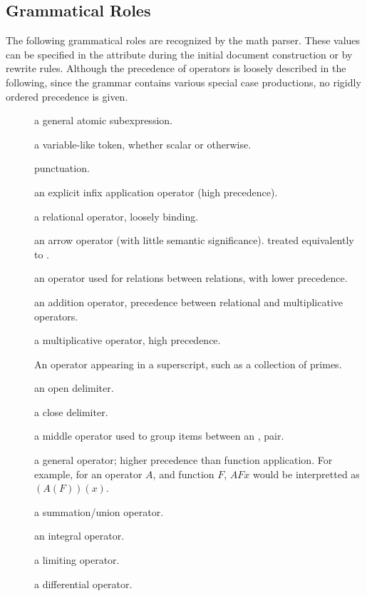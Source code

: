 \documentclass{article}
\begin{document}
\subsection{Grammatical Roles}\label{app:mathroles}
The following grammatical roles are recognized by the math parser.
These values can be specified in the  attribute during the initial 
document construction or by rewrite rules.  Although the precedence of operators
is loosely described in the following, since the grammar contains various special
case productions, no rigidly ordered precedence is given.
\begin{description}
\item[] a general atomic subexpression.
\item[] a variable-like token, whether scalar or otherwise.
\item[] punctuation.
\item[] an explicit infix application operator (high precedence).
\item[] a relational operator, loosely binding.
\item[] an arrow operator (with little semantic significance).
  treated equivalently to .
\item[] an operator used for relations between relations, with lower precedence.
\item[] an addition operator, precedence between relational and multiplicative operators.
\item[] a multiplicative operator, high precedence.
\item[] An operator appearing in a superscript, such as a collection of primes.
\item[] an open delimiter.
\item[] a close delimiter.
\item[] a middle operator used to group items between an ,  pair.
\item[] a general operator; higher precedence than function application.
  For example, for an operator $A$, and function $F$, $A F x$ would be interpretted as $(A(F))(x)$.
\item[] a summation/union operator.
\item[] an integral operator.
\item[] a limiting operator.
\item[] a differential operator.

\end{description}
\end{document}
